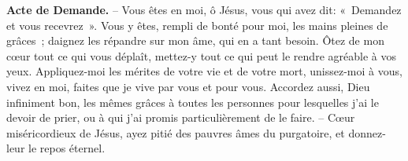 \textbf{Acte de Demande.} – Vous êtes en moi, ô Jésus, vous qui avez dit: «~Demandez et vous recevrez~». Vous y êtes, rempli de bonté pour moi, les mains pleines de grâces~; daignez les répandre sur mon âme, qui en a tant besoin. Ôtez de mon cœur tout ce qui vous déplaît, mettez-y tout ce qui peut le rendre agréable à vos yeux. Appliquez-moi les mérites de votre vie et de votre mort, unissez-moi à vous, vivez en moi, faites que je vive par vous et pour vous. Accordez aussi, Dieu infiniment bon, les mêmes grâces à toutes les personnes pour lesquelles j’ai le devoir de prier, ou à qui j’ai promis particulièrement de le faire. – Cœur miséricordieux de Jésus, ayez pitié des pauvres âmes du purgatoire, et donnez-leur le repos éternel.



